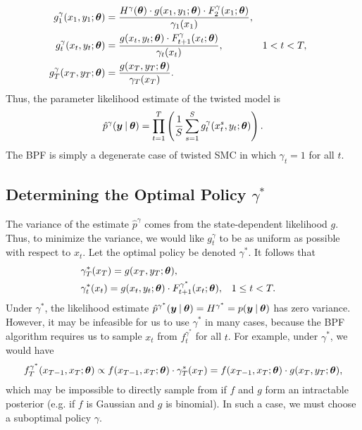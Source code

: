 \documentclass[twoside]{article}
\begin{document}
\begin{align*}
g^\gamma_1(x_1, y_1; \boldsymbol{\theta}) &= \frac{H^\gamma(\boldsymbol{\theta}) \cdot g(x_1, y_1; \boldsymbol{\theta}) \cdot F^\gamma_2(x_1; \boldsymbol{\theta})}{\gamma_1(x_1)}, \\
g^\gamma_t(x_t, y_t; \boldsymbol{\theta}) &= \frac{g(x_t, y_t; \boldsymbol{\theta}) \cdot F^\gamma_{t+1}(x_t; \boldsymbol{\theta})}{\gamma_t(x_t)}, & & 1 < t < T, \\
g^\gamma_T(x_T, y_T; \boldsymbol{\theta}) &= \frac{g(x_T, y_T; \boldsymbol{\theta})}{\gamma_T(x_T)}.
\end{align*}
Thus, the parameter likelihood estimate of the twisted model is 
\begin{align*}
\hat{p}^\gamma(\boldsymbol{y} \:\vert\: \boldsymbol{\theta}) = \prod_{t=1}^T \left(\frac{1}{S}\sum_{s=1}^S g^\gamma_t(x_t^s, y_t; \boldsymbol{\theta})\right). 
\end{align*}  
The BPF is simply a degenerate case of twisted SMC in which $\gamma_t = 1$ for all $t$.

\subsection{Determining the Optimal Policy $\gamma^*$}
The variance of the estimate $\hat{p}^\gamma$ comes from the state-dependent likelihood $g$.  Thus, to minimize the variance, we would like $g^\gamma_t$ to be as uniform as possible with respect to $x_t$.  Let the optimal policy be denoted $\gamma^*$.  It follows that 
\begin{align*}
& \gamma^*_T(x_T) = g(x_T, y_T; \boldsymbol{\theta}), \\
& \gamma^*_t(x_t) = g(x_t, y_t; \boldsymbol{\theta}) \cdot F^{\gamma^*}_{t+1}(x_t; \boldsymbol{\theta}), & & 1 \leq t < T.
\end{align*}  
Under $\gamma^*$, the likelihood estimate $\hat{p}^{\gamma^*}(\boldsymbol{y} \:\vert\: \boldsymbol{\theta}) = H^{\gamma^*} = p(\boldsymbol{y} \:\vert\: \boldsymbol{\theta})$ has zero variance.  However, it may be infeasible for us to use $\gamma^*$ in many cases, because the BPF algorithm requires us to sample $x_t$ from $f_t^{\gamma^*}$ for all $t$.  For example, under $\gamma^*$, we would have
\begin{align*}
f_T^{\gamma^*}(x_{T-1}, x_T; \boldsymbol{\theta}) \propto f(x_{T-1}, x_T; \boldsymbol{\theta}) \cdot \gamma^*_T(x_T) =  f(x_{T-1}, x_T; \boldsymbol{\theta}) \cdot g(x_T, y_T; \boldsymbol{\theta}), 
\end{align*}
which may be impossible to directly sample from if $f$ and $g$ form an intractable posterior (e.g. if $f$ is Gaussian and $g$ is binomial).  In such a case, we must choose a suboptimal policy $\gamma$.
\end{document}

